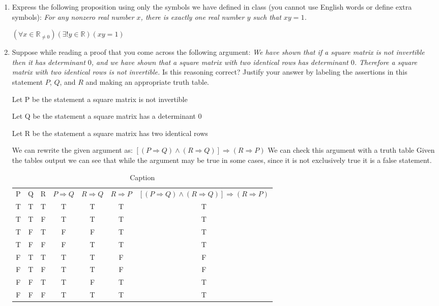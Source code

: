 \documentclass{article}
\newcommand{\bR}{\mathbb{R}}
\begin{document}
{\begin{enumerate}[labelindent=0pt,leftmargin=0pt]
\begin{enumerate}
\end{enumerate}


\item Express the following proposition using only the symbols we have
defined in class (you cannot use English words or define extra symbols):
\textit{For any nonzero real number $x$, there is exactly one real number
$y$ such that $xy=1$.}

\subitem $(\forall x \in \mathbb R_{\ne 0})(\exists!y \in\bR)(xy=1)$


\item Suppose while reading a proof that you come across the following
argument: \textit{We have shown that if a square matrix is not invertible
then it has determinant $0$, and we have shown that a square matrix with
two identical rows has determinant $0$. Therefore a square matrix with two
identical rows is not invertible.} Is this reasoning correct? Justify your
answer by labeling the assertions in this statement $P$, $Q$, and $R$ and
making an appropriate truth table.

\subitem Let P be the statement a square matrix is  not invertible

\subitem Let Q be the statement a square matrix has a determinant $0$

\subitem Let R be the statement a square matrix has two identical rows

\subitem We can rewrite the given argument as:
\subitem $[(P \Rightarrow Q) \land (R \Rightarrow Q)] \Rightarrow (R \Rightarrow P)$
\subitem We can check this argument with a truth table 
\subitem Given the tables output we can see that while the argument may be true in some cases, since it is not exclusively true it is a false statement. 

\begin{table}[]
    \centering
    \begin{tabular}{c|c|c|c|c|c|c}
        P & Q & R & $P \Rightarrow Q$ & $R \Rightarrow Q$ & $R \Rightarrow P$ & $[(P \Rightarrow Q) \land (R \Rightarrow Q)] \Rightarrow (R \Rightarrow P)$ \\
        T & T & T & T & T & T & T \\
        T & T & F & T & T & T & T \\
        T & F & T & F & F & T & T \\
        T & F & F & F & T & T & T \\
        F & T & T & T & T & F & F \\
        F & T & F & T & T & F & F \\
        F & F & T & T & F & T & T \\
        F & F & F & T & T & T & T \\
    \end{tabular}
    \caption{Caption}
    \label{tab:my_label}
\end{table}


\end{enumerate}}
\end{document}
